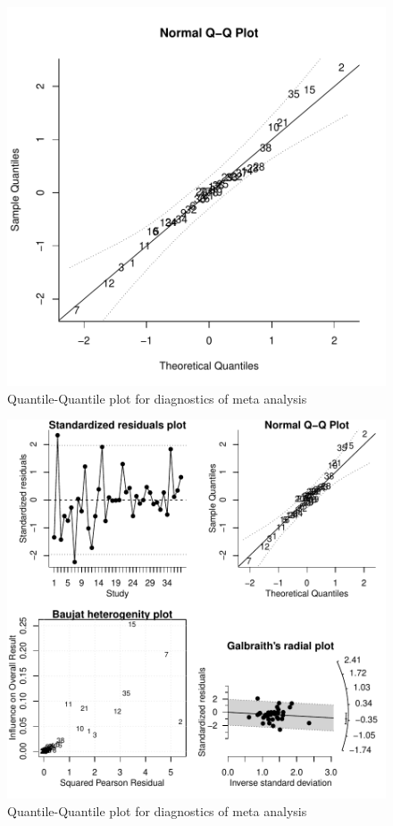 \documentclass[11pt, a4paper]{article} %
\begin{document}
\begin{figure}
\captionsetup{width=0.6\textwidth}
\centering
\includegraphics{sweave_document_TB-qqnorm}
\caption{Quantile-Quantile plot for diagnostics of meta analysis}
\end{figure}





\begin{figure}
\captionsetup{width=0.6\textwidth}
\centering
\includegraphics{sweave_document_TB-diagnostics}
\caption{Quantile-Quantile plot for diagnostics of meta analysis}
\end{figure}
\end{document}
